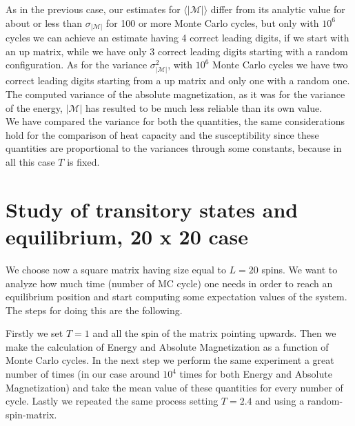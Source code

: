 \documentclass[10pt,a4paper,titlepage]{article}
\begin{document}
\noindent As in the previous case, our estimates for $\langle|\mathscr{M}|\rangle$ differ from its analytic value for about or less than $\sigma_{|\mathscr{M}|}$ for 100 or more Monte Carlo cycles, but only with $10^6$ cycles we can achieve an estimate having 4 correct leading digits, if we start with an up matrix, while we have only 3 correct leading digits starting with a random configuration. As for the variance $\sigma^{2}_{|\mathscr{M}|}$, with $10^6$ Monte Carlo cycles we have two correct leading digits starting from a up matrix and only one with a random one.
\\The computed variance of the absolute magnetization, as it was for the variance of the energy,  $|\mathscr{M}|$ has resulted to be much less reliable than its own value. 
\\
We have compared the variance for both the quantities, the same considerations hold for the comparison of heat capacity and the susceptibility since these quantities are proportional to the variances through some constants, because in all this case $T$ is fixed. 

\section*{Study of transitory states and equilibrium, 20 x 20 case}
\noindent We choose now a square matrix having size equal to $L=20$ spins. We want to analyze how much time (number of MC cycle) one needs in order to reach an equilibrium position and start computing some expectation values of the system. The steps for doing this are the following.

\noindent Firstly we set $T=1$ and all the spin of the matrix pointing upwards. Then we make the calculation of Energy and Absolute Magnetization as a function of Monte Carlo cycles.
In the next step we perform the same experiment a great number of times (in our case around $10^4$ times for both Energy and Absolute Magnetization) and take the mean value of these quantities for every number of cycle.
Lastly we repeated the same process setting $T=2.4$ and using a random-spin-matrix.
\end{document}
